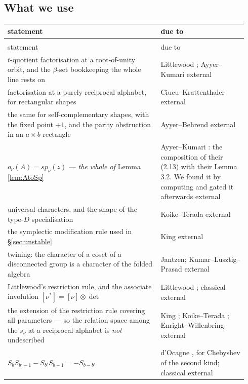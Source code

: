 \documentclass[11pt,reqno]{amsart}
\newcommand{\stext}{\textcolor{hext}{\small external}}
\theoremstyle{plain}
\theoremstyle{definition}
\begin{document}
\subsection*{What we use}
\begingroup{}\footnotesize\setlength{\tabcolsep}{4.0pt}
\begin{longtable}{@{}>{\raggedright\arraybackslash}p{0.60\linewidth}%
                   >{\raggedright\arraybackslash}p{0.34\linewidth}@{}}
\toprule
statement & due to\\
\midrule
\endfirsthead
\multicolumn{2}{@{}l}{\footnotesize\itshape What we use, continued}\\[1pt]
\toprule
statement & due to\\
\midrule
\endhead
$t$-quotient factorisation at a root-of-unity orbit, and the $\beta$-set bookkeeping the whole line
rests on & Littlewood \cite{Lit50}; Ayyer--Kumari \cite{AK22} \stext\\
factorisation at a purely reciprocal alphabet, for rectangular shapes & Ciucu--Krattenthaler
\cite{CK09} \stext\\
the same for self-complementary shapes, with the fixed point $+1$, and the parity obstruction in an
$a\times b$ rectangle & Ayyer--Behrend \cite{AB19} \stext\\
$o_\nu(A)=sp_\nu(z)$ --- \emph{the whole of} Lemma \ref{lem:AtoSp} & Ayyer--Kumari
\cite{AK25}: the composition of their (2.13) with their Lemma 3.2. We found it by computing and
gated it afterwards \stext\\
universal characters, and the shape of the type-$D$ specialisation & Koike--Terada \cite{KT87}
\stext\\
the symplectic modification rule used in \S\ref{sec:unstable} & King \cite{King71} \stext\\
twining: the character of a coset of a disconnected group is a character of the folded algebra &
Jantzen; Kumar--Lusztig--Prasad \cite{Jantzen,KLP} \stext\\
Littlewood's restriction rule, and the associate involution $[\nu^*]=[\nu]\otimes\det$ &
Littlewood \cite{Lit50}; classical \stext\\
the extension of the restriction rule covering all parameters --- so the relation space among the
$s_\nu$ at a reciprocal alphabet is \emph{not} undescribed & King \cite{King71};
Koike--Terada \cite{KT87}; Enright--Willenbring \cite{EW04} \stext\\
$S_bS_{b'-1}-S_{b'}S_{b-1}=-S_{b-b'}$ & d'Ocagne \cite{Doc}, for Chebyshev of the second kind;
classical \stext\\

\end{longtable}
\end{document}
